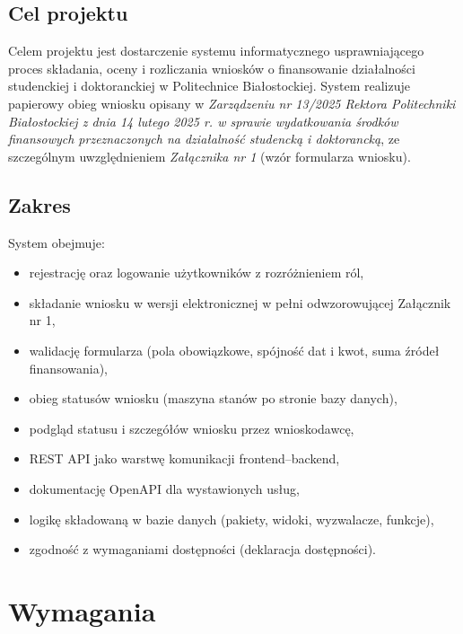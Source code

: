 \documentclass[12pt,a4paper]{article}
\begin{document}
\subsection{Cel projektu}
Celem projektu jest dostarczenie systemu informatycznego usprawniającego proces
składania, oceny i rozliczania wniosków o finansowanie działalności studenckiej
i doktoranckiej w Politechnice Białostockiej. System realizuje papierowy obieg
wniosku opisany w \emph{Zarządzeniu nr 13/2025 Rektora Politechniki Białostockiej
z dnia 14 lutego 2025 r. w sprawie wydatkowania środków finansowych przeznaczonych
na działalność studencką i doktorancką}, ze szczególnym uwzględnieniem
\emph{Załącznika nr 1} (wzór formularza wniosku).

\subsection{Zakres}
System obejmuje:
\begin{itemize}[leftmargin=*]
  \item rejestrację oraz logowanie użytkowników z rozróżnieniem ról,
  \item składanie wniosku w wersji elektronicznej w pełni odwzorowującej Załącznik nr 1,
  \item walidację formularza (pola obowiązkowe, spójność dat i kwot, suma źródeł finansowania),
  \item obieg statusów wniosku (maszyna stanów po stronie bazy danych),
  \item podgląd statusu i szczegółów wniosku przez wnioskodawcę,
  \item REST API jako warstwę komunikacji frontend--backend,
  \item dokumentację OpenAPI dla wystawionych usług,
  \item logikę składowaną w bazie danych (pakiety, widoki, wyzwalacze, funkcje),
  \item zgodność z wymaganiami dostępności (deklaracja dostępności).
\end{itemize}

\section{Wymagania}
\label{sec:wymagania}
\end{document}
